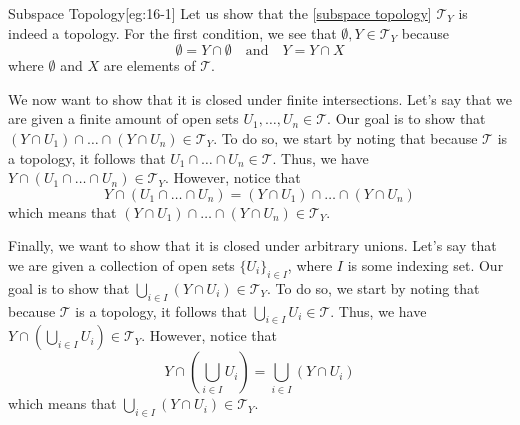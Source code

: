 \begin{egBox}{Subspace Topology}[eg:16-1]
    Let us show that the [\hyperlink{def:16_subspace_top}{subspace topology}] 
    \( \mathcal{T}_{ Y } \) is indeed a topology.
    For the first condition, we see that \( \emptyset, Y \in 
    \mathcal{T}_{ Y } \) because 
    \begin{equation*}
        \emptyset = Y \cap \emptyset
        \quad \mathrm{and} \quad 
        Y = Y \cap X
    \end{equation*}
    where \( \emptyset \) and \( X \) are elements of \( \mathcal{T} \).

    \baseSkip

    We now want to show that it is closed under finite intersections.
    Let's say that we are given a finite amount of open sets 
    \( U_{ 1 } , \ldots , U_{ n } \in \mathcal{T} \). 
    Our goal is to show that 
    \( ( Y \cap U_{ 1 } ) \cap \ldots \cap ( Y \cap U_{ n } ) \in 
    \mathcal{T}_{ Y } \).
    To do so, we start by noting that because \( \mathcal{T} \) is a topology,
    it follows that \( U_{ 1 } \cap \ldots \cap U_{ n } \in \mathcal{T} \).
    Thus, we have \( Y \cap ( U_{ 1 } \cap \ldots \cap U_{ n } ) \in 
    \mathcal{T}_{ Y } \).
    However, notice that 
    \begin{equation*}
        Y \cap ( U_{ 1 } \cap \ldots \cap U_{ n } )
        =
        ( Y \cap U_{ 1 } ) \cap \ldots \cap ( Y \cap U_{ n } )
    \end{equation*}
    which means that \( ( Y \cap U_{ 1 } ) \cap \ldots \cap ( Y \cap U_{ n } ) 
    \in \mathcal{T}_{ Y } \).

    \baseSkip

    Finally, we want to show that it is closed under arbitrary unions.
    Let's say that we are given a collection of open sets 
    \( \{ U_{ i } \}_{ i \in I } \), where \( I \) is some indexing set.
    Our goal is to show that \( \bigcup_{ i \in I } ( Y \cap U_{ i } ) \in 
    \mathcal{T}_{ Y } \).
    To do so, we start by noting that because \( \mathcal{T} \) is a topology,
    it follows that \( \bigcup_{ i \in I } U_{ i } \in \mathcal{T} \).
    Thus, we have \( Y \cap ( \bigcup_{ i \in I } U_{ i } ) \in 
    \mathcal{T}_{ Y } \).
    However, notice that 
    \begin{equation*}
        Y \cap \left( \bigcup_{ i \in I } U_{ i } \right)
        =
        \bigcup_{ i \in I } ( Y \cap U_{ i } )
    \end{equation*}
    which means that \( \bigcup_{ i \in I } ( Y \cap U_{ i } ) \in 
    \mathcal{T}_{ Y } \).
\end{egBox}

